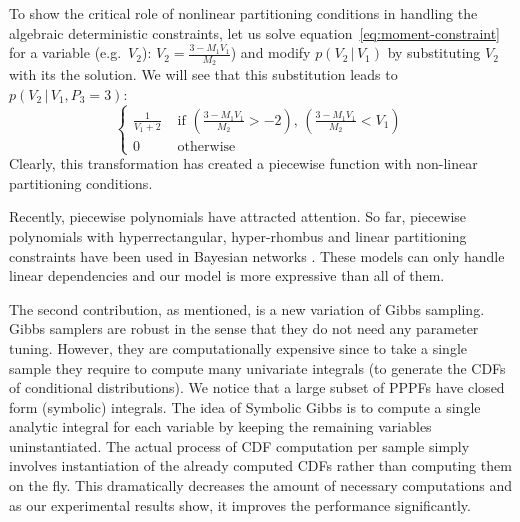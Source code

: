 \documentclass{article}
\newcommand{\case}[2]{#2 &\text{ if } #1}%
\newcommand{\otherwise}[1]{#1 &\text{ otherwise}}
\newcommand{\pr}{p}
\begin{document}
To show the critical role of nonlinear partitioning conditions in handling the algebraic deterministic constraints, 
let us solve equation~\ref{eq:moment-constraint} for a variable (e.g.\ $V_2$):
$V_2 = \frac{3 - M_1 V_1}{M_2}$) and modify $\pr(V_2 \,|\, V_1)$ by substituting $V_2$ with its the solution.
We will see that this substitution leads to $\pr(V_2 \,|\, V_1, P_3 = 3)$:
\begin{equation}
\label{e:fractional-constraint}
\begin{cases}
  \case{(\frac{3 - M_1 V_1}{M_2} > -2) , \, (\frac{3 - M_1 V_1}{M_2} < V_1)}{\frac{1}{V_1 +2}}\\
  \otherwise{0}
  \end{cases}
\end{equation}
Clearly, this transformation has created a piecewise function with non-linear partitioning conditions.

Recently, piecewise polynomials have attracted attention.
So far, piecewise polynomials with hyperrectangular, hyper-rhombus and linear partitioning constraints have been used in Bayesian networks \cite{shenoy2011inference,shenoy2012two,Sanner:12}.
These models can only handle linear dependencies and 
our model is more expressive than all of them. 

The second contribution, as mentioned, is a new variation of Gibbs sampling.  
Gibbs samplers are robust in the sense that they do not need any parameter tuning.
However, they are computationally expensive since to take a single sample they require to compute many univariate integrals (to generate the CDFs of conditional distributions).
We notice that a large subset of PPPFs have closed form (symbolic) integrals. 
The idea of Symbolic Gibbs is to compute a single analytic integral for each variable by keeping the remaining variables uninstantiated. 
The actual process of CDF computation per sample  
simply involves instantiation of the already computed CDFs rather than computing them on the fly.
This dramatically decreases the amount of necessary computations and as our experimental results show, it improves the performance significantly.
\end{document}
